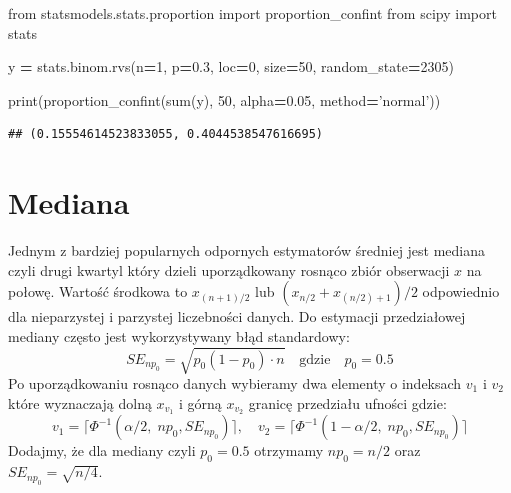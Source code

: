 \documentclass[polish,]{book}
\newenvironment{Shaded}{\begin{snugshade}}{\end{snugshade}}
\newcommand{\BuiltInTok}[1]{#1}
\newcommand{\DecValTok}[1]{\textcolor[rgb]{0.00,0.00,0.81}{#1}}
\newcommand{\FloatTok}[1]{\textcolor[rgb]{0.00,0.00,0.81}{#1}}
\newcommand{\ImportTok}[1]{#1}
\newcommand{\NormalTok}[1]{#1}
\newcommand{\OperatorTok}[1]{\textcolor[rgb]{0.81,0.36,0.00}{\textbf{#1}}}
\newcommand{\StringTok}[1]{\textcolor[rgb]{0.31,0.60,0.02}{#1}}
\begin{document}
\begin{Shaded}
\begin{Highlighting}[]
\ImportTok{from}\NormalTok{ statsmodels.stats.proportion }\ImportTok{import}\NormalTok{ proportion_confint}
\ImportTok{from}\NormalTok{ scipy }\ImportTok{import}\NormalTok{ stats}

\NormalTok{y }\OperatorTok{=}\NormalTok{ stats.binom.rvs(n}\OperatorTok{=}\DecValTok{1}\NormalTok{, p}\OperatorTok{=}\FloatTok{0.3}\NormalTok{, loc}\OperatorTok{=}\DecValTok{0}\NormalTok{, size}\OperatorTok{=}\DecValTok{50}\NormalTok{, random_state}\OperatorTok{=}\DecValTok{2305}\NormalTok{)}

\BuiltInTok{print}\NormalTok{(proportion_confint(}\BuiltInTok{sum}\NormalTok{(y), }\DecValTok{50}\NormalTok{, alpha}\OperatorTok{=}\FloatTok{0.05}\NormalTok{, method}\OperatorTok{=}\StringTok{'normal'}\NormalTok{))}
\end{Highlighting}
\end{Shaded}

\begin{verbatim}
## (0.15554614523833055, 0.4044538547616695)
\end{verbatim}

\hypertarget{R73}{%
\section{Mediana}\label{R73}}

Jednym z bardziej popularnych odpornych estymatorów średniej jest mediana czyli drugi kwartyl który dzieli uporządkowany rosnąco zbiór obserwacji \(x\) na połowę. Wartość środkowa to \(x_{(n+1)/2}\) lub \((x_{n/2}+x_{(n/2 )+1})/2\) odpowiednio dla nieparzystej i parzystej liczebności danych.
Do estymacji przedziałowej mediany często jest wykorzystywany błąd standardowy:
\begin{equation}
SE_{np_0}=\sqrt{p_0(1-p_0)\cdot n}\quad\mbox{gdzie}\quad p_0=0.5
\label{eq:se03}
\end{equation}
Po uporządkowaniu rosnąco danych wybieramy dwa elementy o indeksach \(v_1\) i \(v_2\) które wyznaczają dolną \(x_{v_1}\) i górną \(x_{v_2}\) granicę przedziału ufności gdzie:
\begin{equation}
v_1=\lceil \Phi^{-1}(\alpha/2,\;np_0,SE_{np_0})\rceil,\quad v_2=\lceil  \Phi^{-1}(1-\alpha/2,\;np_0,SE_{np_0})\rceil
\label{eq:se04}
\end{equation}
Dodajmy, że dla mediany czyli \(p_0=0.5\) otrzymamy \(np_0=n/2\) oraz \(SE_{np_0}=\sqrt{n/4}\).
\end{document}
